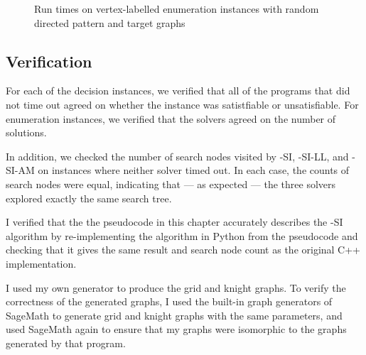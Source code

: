\begin{figure}[htb]
    \centering
    \caption{Run times on vertex-labelled enumeration instances with random directed pattern and target graphs}
    \label{figure:labelled-vf-instance-runtimes}
\end{figure}

\subsection{Verification}

For each of the decision instances, we verified that all of the programs that did not time out
agreed on whether the instance was satistfiable or unsatisfiable.  For enumeration instances,
we verified that the solvers agreed on the number of solutions.

In addition, we checked the number of search nodes visited by \McSplit-SI,
\McSplit-SI-LL, and \McSplit-SI-AM
on instances where neither solver timed out.  In each case, the counts of search nodes were equal,
indicating that --- as expected --- the three solvers explored exactly the same search tree.

I verified that the the pseudocode in this chapter accurately describes the \McSplit-SI
algorithm by re-implementing the algorithm in Python from the pseudocode and checking
that it gives the same result and search node count as the original C++ implementation.

I used my own generator to produce the grid and knight graphs.  To verify the
correctness of the generated graphs, I used the built-in graph generators of
SageMath \citep{sagemath} to generate grid and knight graphs with the same
parameters, and used SageMath again to ensure that my graphs were isomorphic to
the graphs generated by that program.

